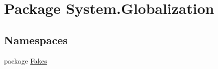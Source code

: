 \hypertarget{namespace_system_1_1_globalization}{\section{Package System.\-Globalization}
\label{namespace_system_1_1_globalization}
}
\subsection*{Namespaces}
\begin{DoxyCompactItemize}
\item 
package \hyperlink{namespace_system_1_1_globalization_1_1_fakes}{Fakes}
\end{DoxyCompactItemize}
